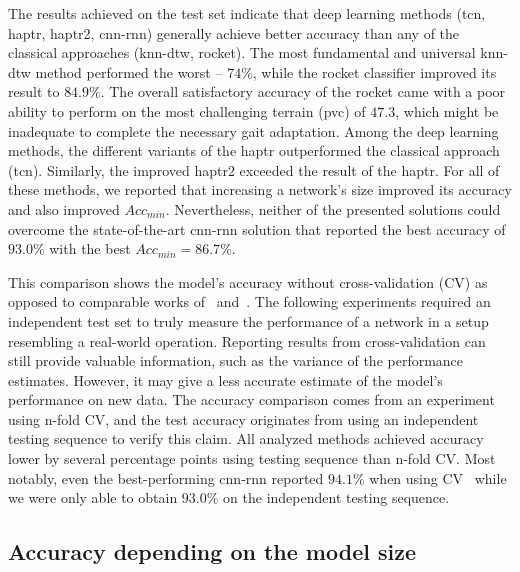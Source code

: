 \documentclass[a4paper, 10pt, twoside]{report}
\begin{document}
The results achieved on the test set indicate that deep learning methods (\acrshort{tcn}, \acrshort{haptr}, \acrshort{haptr}2, \acrshort{cnn}-\acrshort{rnn}) generally achieve better accuracy than any of the classical approaches (\acrshort{knn}-\acrshort{dtw}, \acrshort{rocket}). The most fundamental and universal \acrshort{knn}-\acrshort{dtw} method performed the worst -- $74\%$, while the \acrshort{rocket} classifier improved its result to $84.9\%$. The overall satisfactory accuracy of the \acrshort{rocket} came with a poor ability to perform on the most challenging terrain (\acrshort{pvc}) of $47.3$, which might be inadequate to complete the necessary gait adaptation. Among the deep learning methods, the different variants of the \acrshort{haptr} outperformed the classical approach (\acrshort{tcn}). Similarly, the improved \acrshort{haptr}2 exceeded the result of the \acrshort{haptr}. For all of these methods, we reported that increasing a network's size improved its accuracy and also improved $\textit{Acc}_{min}$. Nevertheless, neither of the presented solutions could overcome the state-of-the-art \acrshort{cnn}-\acrshort{rnn} solution that reported the best accuracy of $93.0\%$ with the best $\textit{Acc}_{min}=86.7\%$.

This comparison shows the model's accuracy without cross-validation (CV) as opposed to comparable works of~\cite{KubaRNN} and~\cite{Ahmadi2021}. The following experiments required an independent test set to truly measure the performance of a network in a setup resembling a real-world operation. Reporting results from cross-validation can still provide valuable information, such as the variance of the performance estimates. However, it may give a less accurate estimate of the model's performance on new data. The accuracy comparison comes from an experiment using n-fold CV, and the test accuracy originates from using an independent testing sequence to verify this claim. All analyzed methods achieved accuracy lower by several percentage points using testing sequence than n-fold CV. Most notably, even the best-performing \acrshort{cnn}-\acrshort{rnn} reported $94.1\%$ when using CV~\cite{KubaRNN} while we were only able to obtain $93.0\%$ on the independent testing sequence.

\subsection{Accuracy depending on the model size}
\label{part:experiments:terrain:modelsize}
\end{document}
